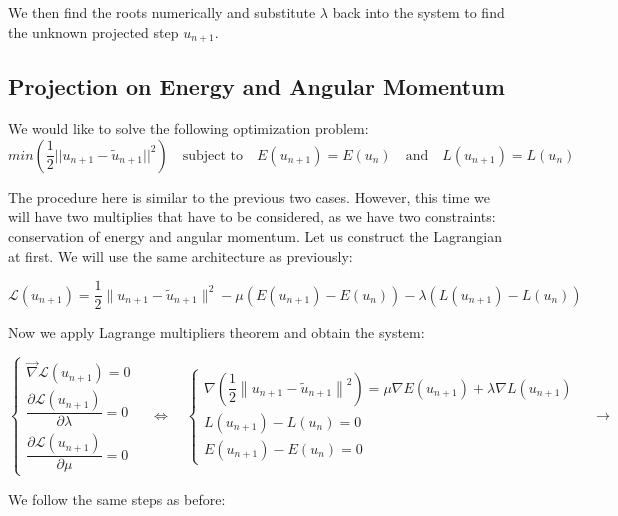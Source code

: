 \documentclass[11pt]{article}
\begin{document}
We then find the roots numerically and substitute $\lambda$ back into the system to find the unknown projected step $u_{n+1}$.


\subsection{Projection on Energy and Angular Momentum}
We would like to solve the following optimization problem:
\[
min(\frac{1}{2}||u_{n+1} - \tilde{u} _{n+1}||^2) \quad \text{subject to} \quad E(u_{n+1}) = E(u_n) \quad \text{and} \quad L(u_{n+1}) = L(u_n)
\]

The procedure here is similar to the previous two cases. However, this time we will have two multiplies that have to be considered, as we have two constraints: conservation of energy and angular momentum. Let us construct the Lagrangian at first. We will use the same architecture as previously:

\[
\mathcal{L}(u_{n+1}) = \frac{1}{2} \| u_{n+1} - \tilde{u}_{n+1} \|^2
- \mu \left( E(u_{n+1}) - E(u_n) \right)
- \lambda \left( L(u_{n+1}) - L(u_n) \right)
\]

Now we apply Lagrange multipliers theorem and obtain the system:

\[
\begin{cases}
\vec{\nabla} \mathcal{L}(u_{n+1}) = 0 \\[10pt]
\dfrac{\partial \mathcal{L}(u_{n+1})}{\partial \lambda} = 0 \\[10pt]
\dfrac{\partial \mathcal{L}(u_{n+1})}{\partial \mu} = 0
\end{cases}
\quad \Longleftrightarrow \quad
\begin{cases}
\nabla \left( \dfrac{1}{2} \left\| u_{n+1} - \tilde{u}_{n+1} \right\|^2 \right)
= \mu \nabla E(u_{n+1}) + \lambda \nabla L(u_{n+1}) \\[10pt]
L(u_{n+1}) - L(u_n) = 0 \\[10pt]
E(u_{n+1}) - E(u_n) = 0
\end{cases}
\quad \rightarrow
\]

We follow the same steps as before:
\end{document}
